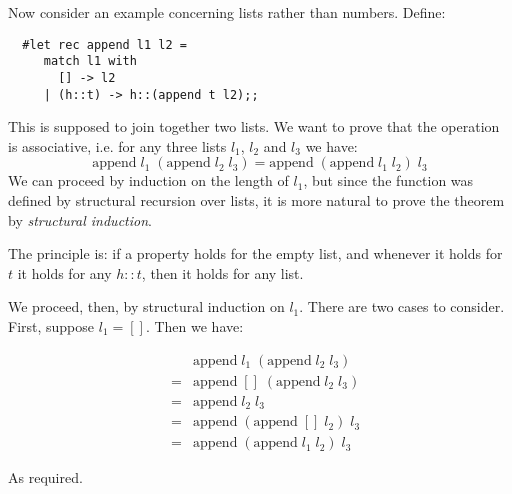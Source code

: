 \begin{slide*}


\vspace*{0.5cm}

Now consider an example concerning lists rather than numbers. Define:

\begin{black}\begin{verbatim}
  #let rec append l1 l2 =
     match l1 with
       [] -> l2
     | (h::t) -> h::(append t l2);;
\end{verbatim}\end{black}

This is supposed to join together two lists. We want to prove that the
operation is associative, i.e. for any three lists {\red $l_1$}, {\red $l_2$}
and {\red $l_3$} we have:
{\red $$ \mbox{append}\; l_1\; (\mbox{append}\; l_2\; l_3) = \mbox{append}\;
(\mbox{append}\; l_1\; l_2)\; l_3 $$}
We can proceed by induction on the length of {\red $l_1$}, but since the
function was defined by structural recursion over lists, it is more natural to
prove the theorem by {\em structural induction}.

The principle is: if a property holds for the empty list, and whenever it holds
for {\red $t$} it holds for any {\red $h::t$}, then it holds for any list.

\end{slide*}






\begin{slide*}


\vspace*{0.5cm}

We proceed, then, by structural induction on {\red $l_1$}. There are two cases
to consider. First, suppose {\red $l_1 = []$}. Then we have:

{\red \begin{eqnarray*}
& & \mbox{append}\; l_1\; (\mbox{append}\; l_2\; l_3)           \\
& = & \mbox{append}\; []\; (\mbox{append}\; l_2\; l_3)          \\
& = & \mbox{append}\; l_2\; l_3                                 \\
& = & \mbox{append}\; (\mbox{append}\; []\; l_2)\; l_3          \\
& = & \mbox{append}\; (\mbox{append}\; l_1\; l_2)\; l_3
\end{eqnarray*}}

As required.

\end{slide*}


